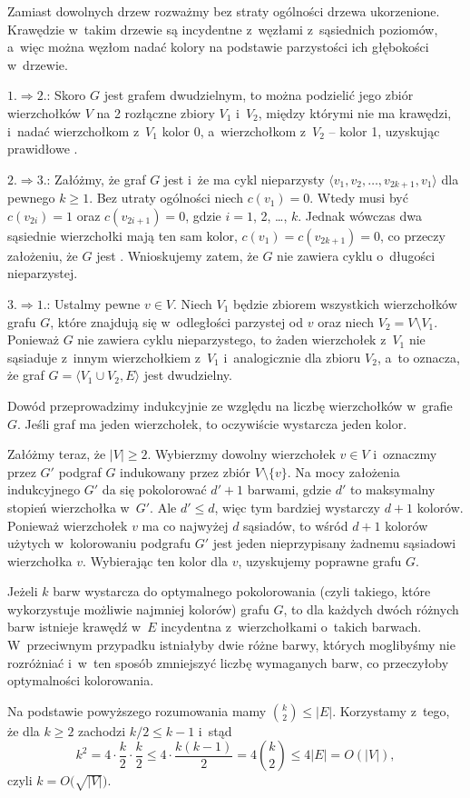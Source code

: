 
\subproblem %
Zamiast dowolnych drzew rozważmy bez straty ogólności drzewa ukorzenione.
Krawędzie w~takim drzewie są incydentne z~węzłami z~sąsiednich poziomów, a~więc można węzłom nadać kolory na podstawie parzystości ich głębokości w~drzewie.

\subproblem %
$1.\Rightarrow 2.$: Skoro $G$ jest grafem dwudzielnym, to można podzielić jego zbiór wierzchołków $V$ na 2 rozłączne zbiory $V_1$ i~$V_2$, między którymi nie ma krawędzi, i~nadać wierzchołkom z~$V_1$ kolor 0, a~wierzchołkom z~$V_2$ -- kolor 1, uzyskując prawidłowe .
\medskip

$2.\Rightarrow 3.$: Załóżmy, że graf $G$ jest  i~że ma cykl nieparzysty $\langle v_1,v_2,\dots,v_{2k+1},v_1\rangle$ dla pewnego $k\ge1$.
Bez utraty ogólności niech $c(v_1)=0$.
Wtedy musi być $c(v_{2i})=1$ oraz $c(v_{2i+1})=0$, gdzie $i=1$, 2, \dots, $k$.
Jednak wówczas dwa sąsiednie wierzchołki mają ten sam kolor, $c(v_1)=c(v_{2k+1})=0$, co przeczy założeniu, że $G$ jest .
Wnioskujemy zatem, że $G$ nie zawiera cyklu o~długości nieparzystej.
\medskip

$3.\Rightarrow 1.$: Ustalmy pewne $v\in V$.
Niech $V_1$ będzie zbiorem wszystkich wierzchołków grafu $G$, które znajdują się w~odległości parzystej od $v$ oraz niech $V_2=V\setminus V_1$.
Ponieważ $G$ nie zawiera cyklu nieparzystego, to żaden wierzchołek z~$V_1$ nie sąsiaduje z~innym wierzchołkiem z~$V_1$ i~analogicznie dla zbioru $V_2$, a~to oznacza, że graf $G=\langle V_1\cup V_2,E\rangle$ jest dwudzielny.

\subproblem %
Dowód przeprowadzimy indukcyjnie ze względu na liczbę wierzchołków w~grafie $G$.
Jeśli graf ma jeden wierzchołek, to oczywiście wystarcza jeden kolor.

Załóżmy teraz, że $|V|\ge2$.
Wybierzmy dowolny wierzchołek $v\in V$ i~oznaczmy przez $G'$ podgraf $G$ indukowany przez zbiór $V\setminus\{v\}$.
Na mocy założenia indukcyjnego $G'$ da się pokolorować $d'+1$ barwami, gdzie $d'$ to maksymalny stopień wierzchołka w~$G'$.
Ale $d'\le d$, więc tym bardziej wystarczy $d+1$ kolorów.
Ponieważ wierzchołek $v$ ma co najwyżej $d$ sąsiadów, to wśród $d+1$ kolorów użytych w~kolorowaniu podgrafu $G'$ jest jeden nieprzypisany żadnemu sąsiadowi wierzchołka $v$.
Wybierając ten kolor dla $v$, uzyskujemy poprawne  grafu $G$.

\subproblem %
Jeżeli $k$ barw wystarcza do optymalnego pokolorowania (czyli takiego, które wykorzystuje możliwie najmniej kolorów) grafu $G$, to dla każdych dwóch różnych barw istnieje krawędź w~$E$ incydentna z~wierzchołkami o~takich barwach.
W~przeciwnym przypadku istniałyby dwie różne barwy, których moglibyśmy nie rozróżniać i~w~ten sposób zmniejszyć liczbę wymaganych barw, co przeczyłoby optymalności kolorowania.

Na podstawie powyższego rozumowania mamy $\binom{k}{2}\le|E|$.
Korzystamy z~tego, że dla $k\ge2$ zachodzi $k/2\le k-1$ i~stąd
\[
    k^2 = 4\cdot\frac{k}{2}\cdot\frac{k}{2} \le 4\cdot\frac{k(k-1)}{2} = 4\binom{k}{2} \le 4|E| = O(|V|),
\]
czyli $k=O\bigl(\!\sqrt{|V|}\bigr)$.
